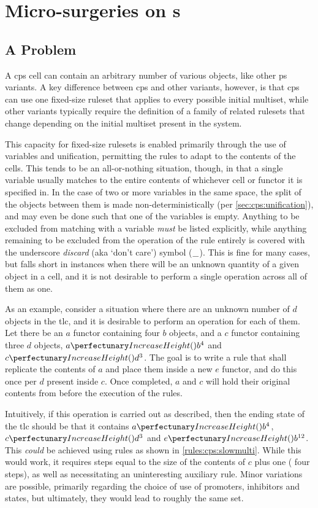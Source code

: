 \section{Micro-surgeries on  s}
\subsection{A Problem}
A \gls{cps} cell can contain an arbitrary number of various objects, like other \gls{ps} variants.  A key difference between \gls{cps} and other variants, however, is that \gls{cps} can use one fixed-size \gls{ruleset} that applies to every possible initial multiset, while other variants typically require the definition of a family of related \glspl{ruleset} that change depending on the initial multiset present in the system.

This capacity for fixed-size \glspl{ruleset} is enabled primarily through the use of variables and unification, permitting the rules to adapt to the contents of the cells.  This tends to be an all-or-nothing situation, though, in that a single variable usually matches to the entire contents of whichever cell or functor it is specified in.  In the case of two or more variables in the same space, the split of the objects between them is made non-deterministically (per \cref{sec:cps:unification}), and may even be done such that one of the variables is empty.  Anything to be excluded from matching with a variable \emph{must} be listed explicitly, while anything remaining to be excluded from the operation of the rule entirely is covered with the underscore \emph{discard} (aka `don't care') symbol (\(\_\)).  This is fine for many cases, but falls short in instances when there will be an unknown quantity of a given object in a cell, and it is not desirable to perform a single operation across all of them as one.

As an example, consider a situation where there are an unknown number of \(d\) objects in the \gls{tlc}, and it is desirable to perform an operation for each of them.  Let there be an \(a\) functor containing four \(b\) objects, and a \(c\) functor containing three \(d\) objects, \ie{} \(\cpfunc{a}{b^4}\) and \(\cpfunc{c}{d^3}\).  The goal is to write a rule that shall replicate the contents of \(a\) and place them inside a new \(e\) functor, and do this once per \(d\) present inside \(c\).  Once completed, \(a\) and \(c\) will hold their original contents from before the execution of the rules.

Intuitively, if this operation is carried out as described, then the ending state of the \gls{tlc} should be that it contains \(\cpfunc{a}{b^4}\), \(\cpfunc{c}{d^3}\) and \(\cpfunc{e}{b^{12}}\).  This \emph{could} be achieved using rules as shown in \cref{rules:cps:slowmulti}.  While this would work, it requires steps equal to the size of the contents of \(c\) plus one (\ie{} four steps), as well as necessitating an uninteresting auxiliary rule.  Minor variations are possible, primarily regarding the choice of use of promoters, inhibitors and states, but ultimately, they would lead to roughly the same set.

